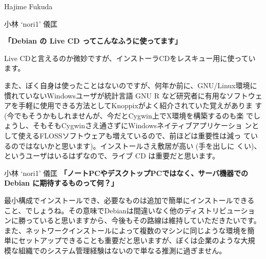 \documentclass[cjk,dvipdfmx,12pt]{beamer}
\newenvironment{commandline}%
{\VerbatimEnvironment
  \begin{Sbox}\begin{minipage}{0.9\hsize}\begin{fontsize}{7.3}{7.3} \begin{BVerbatim}}%
{\end{BVerbatim}\end{fontsize}\end{minipage}\end{Sbox}
  \setlength{\fboxsep}{8pt}

\vspace{6pt}%
\fcolorbox{dancerdarkblue}{dancerlightblue}{\TheSbox}

\vspace{6pt}%
}
\begin{document}
\begin{frame}{Hajime Fukuda}
\end{frame}\begin{frame}{小林 `nori1' 儀匡}

\textbf{「Debian の Live CD ってこんなふうに使ってます」}

Live CDと言えるのか微妙ですが、インストーラCDをレスキュー用に使っています。

また、ぼく自身は使ったことはないのですが、何年か前に、GNU/Linux環境に
慣れていないWindowsユーザが統計言語 GNU R など研究者に有用なソフトウェ
アを手軽に使用できる方法としてKnoppixがよく紹介されていた覚えがありま
す (今でもそうかもしれませんが、今だとCygwin上でX環境を構築するのも楽
でしょうし、そもそもCygwinさえ通さずにWindowsネイティブアプリケーショ
ンとして使えるFLOSSソフトウェアも増えているので、前ほどは重要性は減っ
ているのではないかと思います)。インストールさえ敷居が高い (手を出しに
くい)、というユーザはいるはずなので、ライブ CD は重要だと思います。

\end{frame}\begin{frame}{小林 `nori1' 儀匡}
\textbf{「ノートPCやデスクトップPCではなく、サーバ機器での Debian に期待するものって何？」}

最小構成でインストールでき、必要なものは追加で簡単にインストールできる
こと、でしょうね。その意味でDebianは間違いなく他のディストリビューショ
ンに勝っていると思いますから、今後もその路線は維持していただきたいです。
また、ネットワークインストールによって複数のマシンに同じような環境を簡
単にセットアップできることも重要だと思いますが、ぼくは企業のような大規
模な組織でのシステム管理経験はないので単なる推測に過ぎません。


\end{frame}
\end{document}
